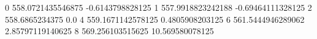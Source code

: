 0 558.0721435546875 -0.6143798828125
1 557.9918823242188 -0.69464111328125
2 558.6865234375 0.0
4 559.1671142578125 0.4805908203125
6 561.5444946289062 2.85797119140625
8 569.256103515625 10.569580078125
